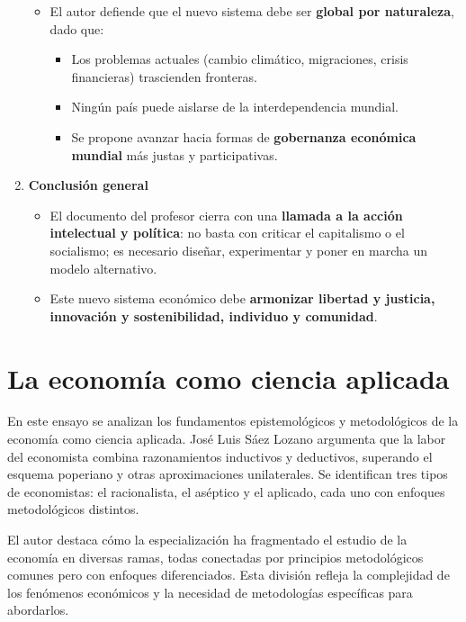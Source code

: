 \documentclass[12pt]{report} %
\providecommand{\tightlist}{%
  \setlength{\itemsep}{0pt}\setlength{\parskip}{0pt}}
\begin{document}
\begin{enumerate}
  \begin{itemize}
  \tightlist
  \item
    El autor defiende que el nuevo sistema debe ser \textbf{global por
    naturaleza}, dado que:

    \begin{itemize}
    \tightlist
    \item
      Los problemas actuales (cambio climático, migraciones, crisis
      financieras) trascienden fronteras.
    \item
      Ningún país puede aislarse de la interdependencia mundial.
    \item
      Se propone avanzar hacia formas de \textbf{gobernanza económica
      mundial} más justas y participativas.
    \end{itemize}
  \end{itemize}
\item
  \textbf{Conclusión general}

  \begin{itemize}
  \tightlist
  \item
    El documento del profesor cierra con una \textbf{llamada a la acción
    intelectual y política}: no basta con criticar el capitalismo o el
    socialismo; es necesario diseñar, experimentar y poner en marcha un
    modelo alternativo.
  \item
    Este nuevo sistema económico debe \textbf{armonizar libertad y
    justicia, innovación y sostenibilidad, individuo y comunidad}.
  \end{itemize}
\end{enumerate}

\hypertarget{la-economuxeda-como-ciencia-aplicada}{%
\section{La economía como ciencia
aplicada}\label{la-economuxeda-como-ciencia-aplicada}}

En este ensayo se analizan los fundamentos epistemológicos y
metodológicos de la economía como ciencia aplicada. José Luis Sáez
Lozano argumenta que la labor del economista combina razonamientos
inductivos y deductivos, superando el esquema poperiano y otras
aproximaciones unilaterales. Se identifican tres tipos de economistas:
el racionalista, el aséptico y el aplicado, cada uno con enfoques
metodológicos distintos.

El autor destaca cómo la especialización ha fragmentado el estudio de la
economía en diversas ramas, todas conectadas por principios
metodológicos comunes pero con enfoques diferenciados. Esta división
refleja la complejidad de los fenómenos económicos y la necesidad de
metodologías específicas para abordarlos.
\end{document}
